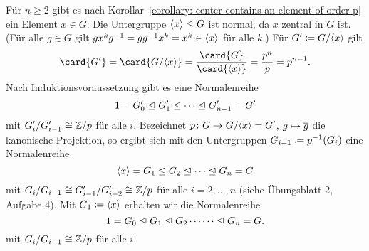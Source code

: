 Für $n \geq 2$ gibt es nach Korollar~\ref{corollary: center contains an element of order p} ein Element $x \in G$.
Die Untergruppe $\langle x\rangle \leq G$ ist normal, da $x$ zentral in $G$ ist.
(Für alle $g \in G$ gilt $g x^k g^{-1} = g g^{-1} x^k = x^k \in \langle x\rangle$ für alle $k$.)
Für $G' \coloneqq G/\langle x\rangle$ gilt
\[
    \card{G'}
  = \card{G/\generated{x}}
  = \frac{\card{G}}{\card{\generated{x}}}
  = \frac{p^n}{p}
  = p^{n-1}.
\]
Nach Induktionsvoraussetzung gibt es eine Normalenreihe
\[
              1
  =           G'_0
  \trianglelefteq  G'_1
  \trianglelefteq  \dotsb
  \trianglelefteq  G'_{n-1}
  =           G'
\]
mit $G'_i/G'_{i-1} \cong \mathbb{Z}/p$ für alle $i$.
Bezeichnet $p \colon G \to G/\langle x\rangle = G'$, $g \mapsto \overline{g}$ die kanonische Projektion, so ergibt sich mit den Untergruppen $G_{i+1} \coloneqq p^{-1}(G_i)$ eine Normalenreihe
\[
              \langle x\rangle
  =           G_1
  \trianglelefteq  G_2
  \trianglelefteq  \dotsb
  \trianglelefteq  G_n
  =           G
\]
mit $G_i/G_{i-1} \cong G'_{i-1}/G'_{i-2} \cong \mathbb{Z}/p$ für alle $i = 2, \dotsc, n$ (siehe Übungsblatt 2, Aufgabe 4).
Mit $G_1 \coloneqq \langle x\rangle$ erhalten wir die Normalenreihe
\[
              1
  =           G_0
  \trianglelefteq  G_1
  \trianglelefteq  G_2
  \dotsb      \dotsb
  \trianglelefteq  G_n
  =           G.
\]
mit $G_i/G_{i-1} \cong \mathbb{Z}/p$ für alle $i$.

